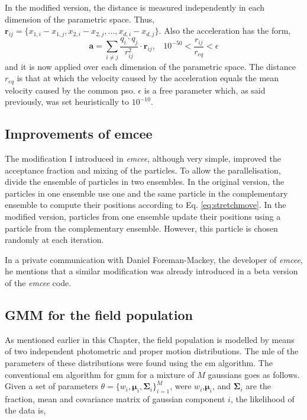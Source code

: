 In the modified version, the distance is measured independently in each dimension of the parametric space. Thus, $\mathbf{r}_{ij}= \{x_{1,i} -x_{1,j},x_{2,i} -x_{2,j},...,x_{d,i} -x_{d,j}\}$. Also the acceleration has the form,
\begin{equation}
\label{eq:PSOacc}
\mathbf{a}=\sum_{i\neq j} \frac{q_i \cdot q_j }{r_{ij}^2} \cdot \mathbf{r}_{ij}, \ \ \ \  10^{-50} < \frac{r_{ij}}{r_{eq}} < \epsilon
\end{equation}
and it is now applied over each dimension of the parametric space. The distance $r_{eq}$ is that at which the velocity caused by the acceleration equals the mean velocity caused by the common \gls{pso}. $\epsilon$ is a free parameter which, as said previously, was set heuristically to $10^{-10}$.

\subsection{Improvements of emcee}
The modification I introduced in \emph{emcee}, although very simple, improved the acceptance fraction and mixing of the particles.
To allow the parallelisation, \citet{Foreman2013} divide the ensemble of particles in two ensembles. In the original version, the particles in one ensemble use one and the same particle in the complementary ensemble to compute their positions according to Eq. \ref{eq:stretchmove}. In the modified version, particles from one ensemble update their positions using a particle from the complementary ensemble. However, this particle is chosen randomly at each iteration. 

In a private communication with Daniel Foreman-Mackey, the developer of \emph{emcee}, he mentions that a similar modification was already introduced in a beta version of the \emph{emcee} code.

\subsection{GMM for the field population}
\label{sec:codeGMM}
As mentioned earlier in this Chapter, the field population is modelled by means of two independent photometric and proper motion distributions. The \gls{mle} of the parameters of these distributions were found using the \gls{em} algorithm.  The conventional \gls{em} algorithm for \gls{gmm} \citep{Dempster1977} for a mixture of $M$ gaussians goes as follows. Given a set of parameters $\theta=\{w_i,\boldsymbol{\mu}_i,\boldsymbol{\Sigma}_i\}_{i=1}^M$, were $w_i$,$\boldsymbol{\mu}_i$, and $\boldsymbol{\Sigma}_i$ are the fraction, mean and covariance matrix of gaussian component $i$, the likelihood of the data is,

